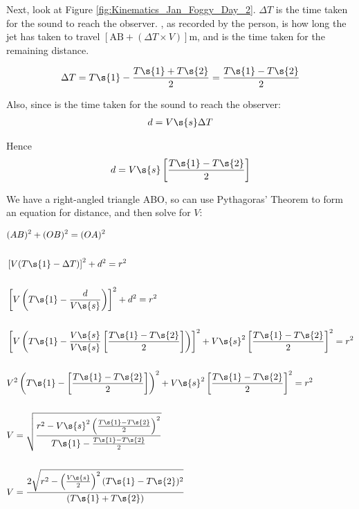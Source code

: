 \begin{problem}
{Next, look at Figure \ref{fig:Kinematics_Jan_Foggy_Day_2}. $\Delta T$ is the time taken for the sound to reach the observer. , as recorded by the person, is how long the jet has taken to travel $[\textrm{AB} + (\Delta T \times V)]$m, and  is the time taken for the remaining distance.

\begin{align*} \Delta T = T\s{1} - \frac{T\s{1}+T\s{2}}{2} = \frac{T\s{1}-T\s{2}}{2} \end{align*}

Also, since  is the time taken for the sound to reach the observer: \begin{align*} d = V\s{s}\Delta{T}\end{align*}

Hence \begin{align*} d = V\s{s}\left[\frac{T\s{1}-T\s{2}}{2}\right]\end{align*}


We have a right-angled triangle ABO, so can use Pythagoras' Theorem to form an equation for distance, and then solve for $V$:

\begin{align*} &(AB)^{2} + (OB)^{2} = (OA)^{2} \\
\\&\left[V(T\s{1} - \Delta{T})\right]^{2} + d^{2} = r^{2} \\
\\&\left[V\left(T\s{1} - \frac{d}{V\s{s}}\right)\right]^{2} + d^{2} = r^{2} \\ 
\\&\left[V\left(T\s{1} - \frac{V\s{s}}{V\s{s}}\left[\frac{T\s{1} - T\s{2}}{2}\right]\right)\right]^{2} + V\s{s}^{2}\left[\frac{T\s{1} - T\s{2}}{2}\right]^{2} = r^{2} \\
\\&V^{2}\left(T\s{1} - \left[\frac{T\s{1}-T\s{2}}{2}\right]\right)^{2} + V\s{s}^{2}\left[\frac{T\s{1} - T\s{2}}{2}\right]^{2} = r^{2} \\
\\&V = \sqrt{\frac{r^{2} - V\s{s}^{2}\left(\frac{T\s{1}-T\s{2}}{2}\right)^{2}}{T\s{1} - \frac{T\s{1}-T\s{2}}{2}}}\\
\\&V = \frac{2\sqrt{r^{2} - \left(\frac{V\s{s}}{2}\right)^{2}(T\s{1}-T\s{2})^{2}}}{(T\s{1}+T\s{2})}\end{align*}

}
\end{problem}
